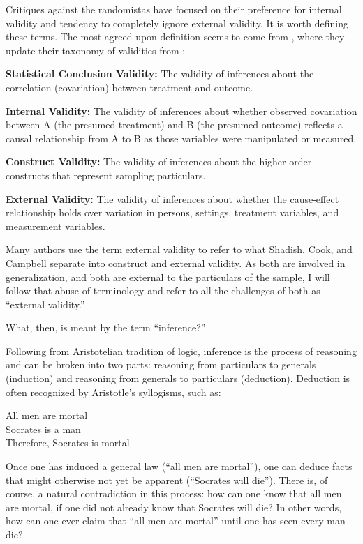 \documentclass[a4paper,12pt]{article}
\begin{document}
Critiques against the randomistas have focused on their preference for internal validity and tendency to completely ignore external validity. It is worth defining these terms. The most agreed upon definition seems to come from \cite{Shadish2002}, where they update their taxonomy of validities from \cite{Cook1979}:

\begin{displayquote}
\textbf{Statistical Conclusion Validity:} The validity of inferences about the correlation (covariation) between treatment and outcome.

\textbf{Internal Validity:} The validity of inferences about whether observed covariation between A (the presumed treatment) and B (the presumed outcome) reflects a causal relationship from A to B as those variables were manipulated or measured.

\textbf{Construct Validity:} The validity of inferences about the higher order constructs that represent sampling particulars.

\textbf{External Validity:} The validity of inferences about whether the cause-effect relationship holds over variation in persons, settings, treatment variables, and measurement variables.  
\end{displayquote}

Many authors use the term external validity to refer to what Shadish, Cook, and Campbell separate into construct and external validity. As both are involved in generalization, and both are external to the particulars of the sample, I will follow that abuse of terminology and refer to all the challenges of both as ``external validity.''

What, then, is meant by the term ``inference?''  

Following from Aristotelian tradition of logic, inference is the process of reasoning and can be broken into two parts: reasoning from particulars to generals (induction) and reasoning from generals to particulars (deduction). Deduction is often recognized by Aristotle's syllogisms, such as:

\begin{displayquote}
All men are mortal \\
Socrates is a man  \\
Therefore, Socrates is mortal
\end{displayquote}

Once one has induced a general law (``all men are mortal''), one can deduce facts that might otherwise not yet be apparent (``Socrates will die''). There is, of course, a natural contradiction in this process: how can one know that all men are mortal, if one did not already know that Socrates will die? In other words, how can one ever claim that ``all men are mortal'' until one has seen every man die? 
\end{document}
